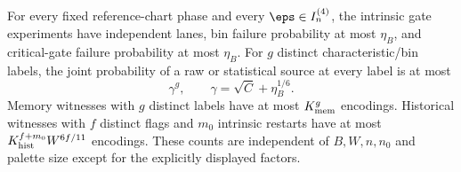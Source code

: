\begin{lemma}\label{lem:lower-sensors}
For every fixed reference-chart phase and every $\eps\in I_n^{(4)}$, the intrinsic gate experiments have independent lanes, bin failure probability at most $\eta_B$, and critical-gate failure probability at most $\eta_B$. For $g$ distinct characteristic/bin labels, the joint probability of a raw or statistical source at every label is at most
\[
 \gamma^g,\qquad \gamma=\sqrt C+\eta_B^{1/6}.
\]
Memory witnesses with $g$ distinct labels have at most $K_{\rm mem}^g$ encodings. Historical witnesses with $f$ distinct flags and $m_0$ intrinsic restarts have at most $K_{\rm hist}^{f+m_0}W^{6f/11}$ encodings. These counts are independent of $B,W,n,n_0$ and palette size except for the explicitly displayed factors.
\end{lemma}
